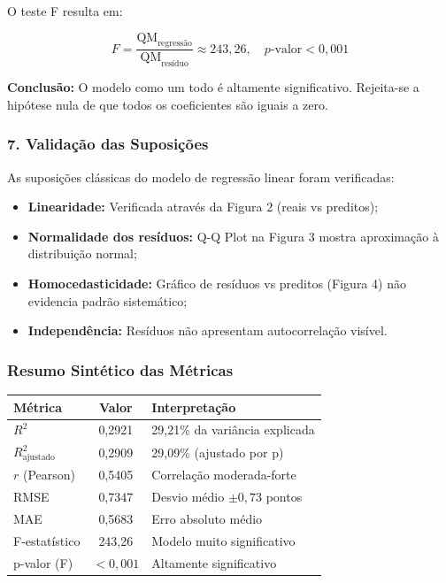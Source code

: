 \documentclass[12pt,a4paper]{article}
\begin{document}
O teste F resulta em:

\begin{equation}
F = \frac{\text{QM}_{\text{regressão}}}{\text{QM}_{\text{resíduo}}} \approx 243,26, \quad p\text{-valor} < 0,001
\end{equation}

\textbf{Conclusão:} O modelo como um todo é altamente significativo. Rejeita-se a hipótese nula de que todos os coeficientes são iguais a zero.

\subsubsection*{7. Validação das Suposições}

As suposições clássicas do modelo de regressão linear foram verificadas:

\begin{itemize}
  \item \textbf{Linearidade:} Verificada através da Figura 2 (reais vs preditos);
  \item \textbf{Normalidade dos resíduos:} Q-Q Plot na Figura 3 mostra aproximação à distribuição normal;
  \item \textbf{Homocedasticidade:} Gráfico de resíduos vs preditos (Figura 4) não evidencia padrão sistemático;
  \item \textbf{Independência:} Resíduos não apresentam autocorrelação visível.
\end{itemize}

\subsubsection*{Resumo Sintético das Métricas}

\begin{center}
\begin{tabular}{|l|c|l|}
\hline
\textbf{Métrica} & \textbf{Valor} & \textbf{Interpretação} \\
\hline
$R^2$ & 0,2921 & 29,21\% da variância explicada \\
$R^2_{\text{ajustado}}$ & 0,2909 & 29,09\% (ajustado por p) \\
$r$ (Pearson) & 0,5405 & Correlação moderada-forte \\
RMSE & 0,7347 & Desvio médio $\pm 0,73$ pontos \\
MAE & 0,5683 & Erro absoluto médio \\
F-estatístico & 243,26 & Modelo muito significativo \\
p-valor (F) & $<0,001$ & Altamente significativo \\
\hline
\end{tabular}
\end{center}
\end{document}
